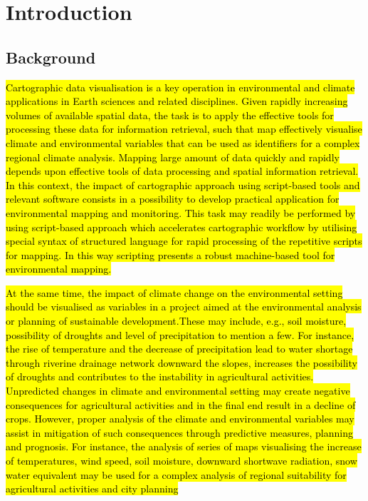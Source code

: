 \documentclass[geosciences,article,submit,pdftex,moreauthors]{Definitions/mdpi}
\begin{document}
\section{Introduction}

\subsection{Background}

\hl{Cartographic data visualisation is a key operation in environmental and climate applications in Earth sciences and related disciplines. Given rapidly increasing volumes of available spatial data, the task is to apply the effective tools for processing these data for information retrieval, such that map effectively visualise climate and environmental variables that can be used as identifiers for a complex regional climate analysis. 
Mapping large amount of data quickly and rapidly depends upon effective tools of data processing and spatial information retrieval. In this context, the impact of cartographic approach using script-based tools and relevant software  consists in a possibility to develop practical application for environmental mapping and monitoring. This task may readily be performed by using script-based approach which accelerates cartographic workflow by utilising special syntax of structured language for rapid processing of the repetitive scripts for mapping. In this way scripting presents a robust machine-based tool for environmental mapping.} 

\hl{At the same time, the impact of climate change on the environmental setting should be visualised as variables in a project aimed at the environmental analysis or planning of sustainable development.These may include, e.g., soil moisture, possibility of droughts and level of precipitation to mention a few. For instance, the rise of temperature and the decrease of precipitation lead to water shortage through riverine drainage network downward the slopes, increases the possibility of droughts and contributes to the instability in agricultural activities. Unpredicted changes in climate and environmental setting may create negative consequences for agricultural activities and in the final end result in a decline of crops. However, proper analysis of the climate and environmental variables may assist in mitigation of such consequences through predictive measures, planning and prognosis. For instance, the analysis of series of maps visualising the increase of temperatures, wind speed, soil moisture, downward shortwave radiation, snow water equivalent may be used for a complex analysis of regional suitability for agricultural activities and city planning}
\end{document}
